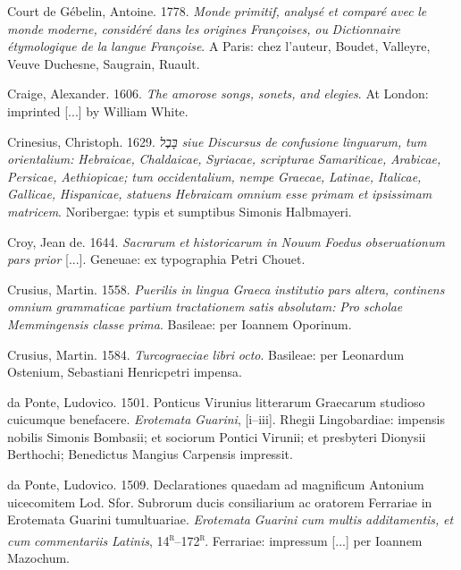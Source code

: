 Court de Gébelin, Antoine. 1778. \textit{Monde} \textit{primitif,} \textit{analysé} \textit{et} \textit{comparé} \textit{avec} \textit{le} \textit{monde} \textit{moderne,} \textit{considéré} \textit{dans} \textit{les} \textit{origines} \textit{Françoises,} \textit{ou} \textit{Dictionnaire} \textit{étymologique} \textit{de} \textit{la} \textit{langue} \textit{Françoise}. A Paris: chez l’auteur, Boudet, Valleyre, Veuve Duchesne, Saugrain, Ruault.

Craige, Alexander. 1606. \textit{The} \textit{amorose} \textit{songs,} \textit{sonets,} \textit{and} \textit{elegies}. At London: imprinted [...] by William White.

Crinesius, Christoph. 1629. \textit{בָּבֶל} \textit{siue} \textit{Discursus} \textit{de} \textit{confusione} \textit{linguarum,} \textit{tum} \textit{orientalium:} \textit{Hebraicae,} \textit{Chaldaicae,} \textit{Syriacae,} \textit{scripturae} \textit{Samariticae,} \textit{Arabicae,} \textit{Persicae,} \textit{Aethiopicae;} \textit{tum} \textit{occidentalium,} \textit{nempe} \textit{Graecae,} \textit{Latinae,} \textit{Italicae,} \textit{Gallicae,} \textit{Hispanicae,} \textit{statuens} \textit{Hebraicam} \textit{omnium} \textit{esse} \textit{primam} \textit{et} \textit{ipsissimam} \textit{matricem}. Noribergae: typis et sumptibus Simonis Halbmayeri.

Croy, Jean de. 1644. \textit{Sacrarum} \textit{et} \textit{historicarum} \textit{in} \textit{Nouum} \textit{Foedus} \textit{obseruationum} \textit{pars} \textit{prior} [...]. Geneuae: ex typographia Petri Chouet.

Crusius, Martin. 1558. \textit{Puerilis} \textit{in} \textit{lingua} \textit{Graeca} \textit{institutio} \textit{pars} \textit{altera,} \textit{continens} \textit{omnium} \textit{grammaticae} \textit{partium} \textit{tractationem} \textit{satis} \textit{absolutam:} \textit{Pro} \textit{scholae} \textit{Memmingensis} \textit{classe} \textit{prima}. Basileae: per Ioannem Oporinum.

Crusius, Martin. 1584. \textit{Turcograeciae} \textit{libri} \textit{octo}. Basileae: per Leonardum Ostenium, Sebastiani Henricpetri impensa.

da Ponte, Ludovico. 1501. Ponticus Virunius litterarum Graecarum studioso cuicumque benefacere. \textit{Erotemata} \textit{Guarini}, [i–iii]. Rhegii Lingobardiae: impensis nobilis Simonis Bombasii; et sociorum Pontici Virunii; et presbyteri Dionysii Berthochi; Benedictus Mangius Carpensis impressit.

da Ponte, Ludovico. 1509. Declarationes quaedam ad magnificum Antonium uicecomitem Lod. Sfor. Subrorum ducis consiliarium ac oratorem Ferrariae in Erotemata Guarini tumultuariae. \textit{Erotemata} \textit{Guarini} \textit{cum} \textit{multis} \textit{additamentis,} \textit{et} \textit{cum} \textit{commentariis} \textit{Latinis}, 14\textsc{\textsuperscript{r}}–172\textsc{\textsuperscript{r}}. Ferrariae: impressum [...] per Ioannem Mazochum.

